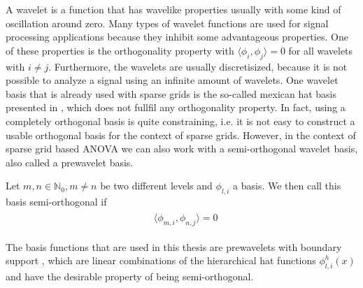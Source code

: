 \documentclass[
  a4paper,  %
  twoside,  %
  bibliography=totoc,
  headsepline,
  cleardoublepage=empty,
  parskip=half,
  draft=false
]{scrbook}
\begin{document}
A wavelet is a function that has wavelike properties usually with some kind of oscillation around zero.
Many types of wavelet functions are used for signal processing applications because they inhibit some advantageous properties.
One of these properties is the orthogonality property with $\langle \phi_{i},\phi_{j} \rangle = 0$ for all wavelets with $i \neq j$.
Furthermore,  the wavelets are usually discretisized, because it is not possible to analyze a signal using an infinite amount of wavelets.
One wavelet basis that is already used with sparse grids is the so-called mexican hat basis presented in \cite{}, which does not fullfil any orthogonality property.
In fact, using a completely orthogonal basis is quite constraining, i.e. it is not easy to construct a usable orthogonal basis for the context of sparse grids.
However, in the context of sparse grid based ANOVA we can also work with a semi-orthogonal wavelet basis, also called a prewavelet basis.

\begin{definition}
Let $m,n \in \mathds{N}_0, m \neq n$ be two different levels and $\phi_{l,i}$ a basis.
We then call this basis semi-orthogonal if
\begin{align}
\begin{split}
&\langle \phi_{m,i},\phi_{n,j} \rangle = 0
\nonumber
\end{split}
\end{align}
\end{definition}

The basis functions that are used in this thesis are prewavelets with boundary support \cite{GO95,HP17}, which are linear combinations of the hierarchical hat functions $\phi_{l,i}^h(x)$ and have the desirable property of being semi-orthogonal.
\end{document}
